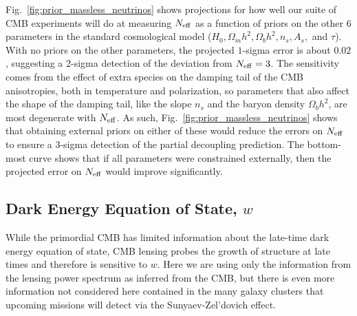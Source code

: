 \documentclass[aps,prd,reprint,superscriptaddress]{revtex4-1}
\newcommand{\reffig}[1]{Fig.~\ref{fig:#1}}
\begin{document}
\reffig{prior_massless_neutrinos} shows projections for how well our suite of CMB experiments will do at measuring $N_{\rm eff}$ as a function of priors on the other 6 parameters in the standard cosmological model ($H_0, \Omega_mh^2,\Omega_bh^2, n_s, A_s,$ and $\tau$). With no priors on the other parameters, the projected $1$-sigma error is  about $0.02$, suggesting a 2-sigma detection of the deviation from $N_{\rm eff}=3$. The sensitivity comes from the effect of extra species on the damping tail of the CMB anisotropies, both in temperature and polarization, so parameters that also affect the shape of the damping tail, like the slope $n_s$ and the baryon density $\Omega_bh^2$, are most degenerate with $N_{\rm eff}$. As such, \reffig{prior_massless_neutrinos} shows that obtaining external priors on either of these would reduce the errors on $N_{\rm eff}$ to ensure a 3-sigma detection of the partial decoupling prediction. The bottom-most curve shows that if all parameters were constrained externally, then the projected error on $N_{\rm eff}$ would improve significantly.

\subsection{Dark Energy Equation of State, $w$}

While the primordial CMB has limited information about the late-time dark energy equation of state, CMB lensing probes the growth of structure at late times and therefore is sensitive to $w$. Here we are using only the information from the lensing power spectrum as inferred from the CMB, but there is even more information not considered here contained in the many galaxy clusters that upcoming missions will detect via the Sunyaev-Zel'dovich effect. 

\end{document}
